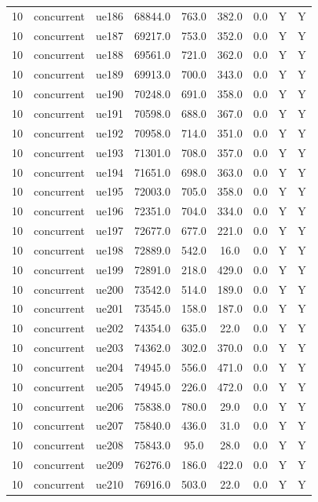\begin{table}[ht]
\begin{tabular}{|c|c|c|c|c|c|c|c|c|}
10 & concurrent & ue186 & 68844.0 & 763.0 & 382.0 & 0.0 & Y & Y \\
10 & concurrent & ue187 & 69217.0 & 753.0 & 352.0 & 0.0 & Y & Y \\
10 & concurrent & ue188 & 69561.0 & 721.0 & 362.0 & 0.0 & Y & Y \\
10 & concurrent & ue189 & 69913.0 & 700.0 & 343.0 & 0.0 & Y & Y \\
10 & concurrent & ue190 & 70248.0 & 691.0 & 358.0 & 0.0 & Y & Y \\
10 & concurrent & ue191 & 70598.0 & 688.0 & 367.0 & 0.0 & Y & Y \\
10 & concurrent & ue192 & 70958.0 & 714.0 & 351.0 & 0.0 & Y & Y \\
10 & concurrent & ue193 & 71301.0 & 708.0 & 357.0 & 0.0 & Y & Y \\
10 & concurrent & ue194 & 71651.0 & 698.0 & 363.0 & 0.0 & Y & Y \\
10 & concurrent & ue195 & 72003.0 & 705.0 & 358.0 & 0.0 & Y & Y \\
10 & concurrent & ue196 & 72351.0 & 704.0 & 334.0 & 0.0 & Y & Y \\
10 & concurrent & ue197 & 72677.0 & 677.0 & 221.0 & 0.0 & Y & Y \\
10 & concurrent & ue198 & 72889.0 & 542.0 & 16.0 & 0.0 & Y & Y \\
10 & concurrent & ue199 & 72891.0 & 218.0 & 429.0 & 0.0 & Y & Y \\
10 & concurrent & ue200 & 73542.0 & 514.0 & 189.0 & 0.0 & Y & Y \\
10 & concurrent & ue201 & 73545.0 & 158.0 & 187.0 & 0.0 & Y & Y \\
10 & concurrent & ue202 & 74354.0 & 635.0 & 22.0 & 0.0 & Y & Y \\
10 & concurrent & ue203 & 74362.0 & 302.0 & 370.0 & 0.0 & Y & Y \\
10 & concurrent & ue204 & 74945.0 & 556.0 & 471.0 & 0.0 & Y & Y \\
10 & concurrent & ue205 & 74945.0 & 226.0 & 472.0 & 0.0 & Y & Y \\
10 & concurrent & ue206 & 75838.0 & 780.0 & 29.0 & 0.0 & Y & Y \\
10 & concurrent & ue207 & 75840.0 & 436.0 & 31.0 & 0.0 & Y & Y \\
10 & concurrent & ue208 & 75843.0 & 95.0 & 28.0 & 0.0 & Y & Y \\
10 & concurrent & ue209 & 76276.0 & 186.0 & 422.0 & 0.0 & Y & Y \\
10 & concurrent & ue210 & 76916.0 & 503.0 & 22.0 & 0.0 & Y & Y \\

\end{tabular}
\end{table}
